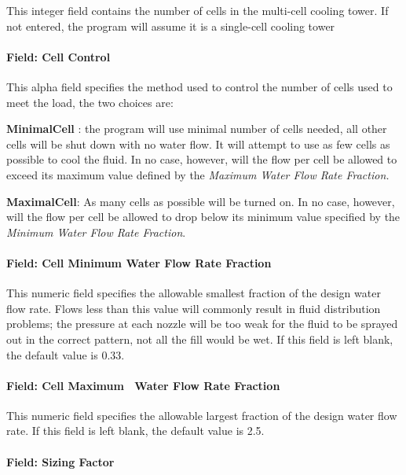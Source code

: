 This integer field contains the number of cells in the multi-cell cooling tower. If not entered, the program will assume it is a single-cell cooling tower

\paragraph{Field: Cell Control}\label{field-cell-control}

This alpha field specifies the method used to control the number of cells used to meet the load, the two choices are:

\textbf{MinimalCell} : the program will use minimal number of cells needed, all other cells will be shut down with no water flow. It will attempt to use as few cells as possible to cool the fluid. In no case, however, will the flow per cell be allowed to exceed its maximum value defined by the \emph{Maximum Water Flow Rate Fraction.}

\textbf{MaximalCell}: As many cells as possible will be turned on. In no case, however, will the flow per cell be allowed to drop below its minimum value specified by the \emph{Minimum Water Flow Rate Fraction}.

\paragraph{Field: Cell Minimum Water Flow Rate Fraction}\label{field-cell-minimum-water-flow-rate-fraction}

This numeric field specifies the allowable smallest fraction of the design water flow rate. Flows less than this value will commonly result in fluid distribution problems; the pressure at each nozzle will be too weak for the fluid to be sprayed out in the correct pattern, not all the fill would be wet. If this field is left blank, the default value is 0.33.

\paragraph{Field: Cell Maximum~ Water Flow Rate Fraction}\label{field-cell-maximum-water-flow-rate-fraction}

This numeric field specifies the allowable largest fraction of the design water flow rate. If this field is left blank, the default value is 2.5.

\paragraph{Field: Sizing Factor}\label{sizing-factor-01}

